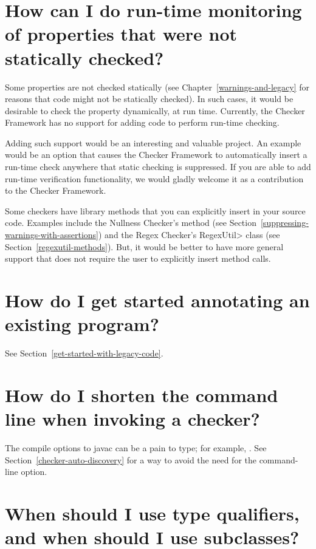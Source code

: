 \section{How can I do run-time monitoring of properties that were not statically checked?\label{faq-run-time-checking}}

Some properties are not checked statically (see
Chapter~\ref{warnings-and-legacy} for reasons that code might not be
statically checked).  In such cases, it would be desirable to check the
property dynamically, at run time.
Currently, the Checker Framework has no support for adding code to perform
run-time checking.

Adding such support would be an interesting and valuable project.
An example would be an option that causes the Checker Framework to
automatically insert a run-time check anywhere that static checking is
suppressed.
If you
are able to add run-time verification functionality, we would gladly
welcome it as a contribution to the Checker Framework.

Some checkers have library methods that you can explicitly insert in your
source code.
Examples include the Nullness Checker's
 method (see
Section~\ref{suppressing-warnings-with-assertions}) and the Regex Checker's
\<RegexUtil> class (see Section~\ref{regexutil-methods}).
But, it would be better to have more general support that does not require
the user to explicitly insert method calls.


\section{How do I get started annotating an existing program?\label{faq-annotate-existing-program}}

See Section~\ref{get-started-with-legacy-code}.


\section{How do I shorten the command line when invoking a checker?\label{faq-shorten-command-line}}

The compile options to javac can be a pain to type; for example,
.
See Section~\ref{checker-auto-discovery} for a way to avoid the need for
the  command-line option.


\section{When should I use type qualifiers, and when should I use subclasses?\label{faq-qualifiers-vs-subclasses}}

